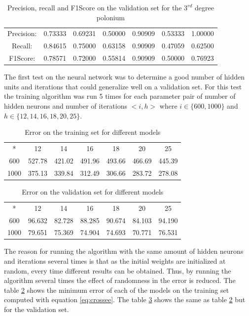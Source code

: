 \documentclass{IEEEtran}
\begin{document}
\begin{table}
\centering
\begin{tabular}{|c|c|c|c|c|c|c|}
\hline
Precision: & 0.73333 & 0.69231 & 0.50000 & 0.90909 & 0.53333 & 1.00000 \\
Recall: &  0.84615 & 0.75000 & 0.63158 & 0.90909 & 0.47059 & 0.62500 \\
F1Score: & 0.78571 & 0.72000 & 0.55814 & 0.90909 & 0.50000 & 0.76923 \\
\hline
\end{tabular}
\caption{Precision, recall and F1Score on the validation set for the $3^{rd}$ degree polonium}
\label{tb:tscoreslr}
\end{table}



The first test on the neural network was to determine a good number of hidden units and iterations that could generalize well
on a validation set. For this test the training algorithm was run 5 times for each parameter pair of number
of hidden neurons and number of iterations $<i,h>$ where $i \in \{600,1000\}$ and $h \in \{12,14,16,18,20,25\}$.

\begin{table}
\centering
\begin{tabular}{|c|c|c|c|c|c|c|}
\hline
* & 12 & 14 & 16 & 18 & 20 & 25 \\
600 & 527.78 & 421.02 & 491.96 & 493.66 & 466.69 & 445.39 \\
1000 & 375.13 & 339.84 & 312.49 & 306.66 & 283.72 & 278.08 \\ 
\hline
\end{tabular}
\caption{Error on the training set for different models}
\label{tb:terror}
\end{table}

\begin{table}
\centering
\begin{tabular}{|c|c|c|c|c|c|c|}
\hline
* & 12 & 14 & 16 & 18 & 20 & 25 \\
600 & 96.632 & 82.728 & 88.285 & 90.674 & 84.103 & 94.190 \\
1000 & 79.651 & 75.369 & 74.904 & 74.693 & 70.771 & 76.531 \\ 
\hline
\end{tabular}
\caption{Error on the validation set for different models}
\label{tb:verror}
\end{table}

The reason for running the algorithm with the same amount of hidden neurons and iterations several times is
that as the initial weights are initialized at random, every time different results can be obtained. Thus,
by running the algorithm several times the effect of randomness in the error is reduced. The table
\ref{tb:terror} shows the minimum error of each of the models on the training set computed with equation \ref{eq:crossee}.
The table \ref{tb:verror} shows the same as table \ref{tb:terror} but for the validation set.
\end{document}
